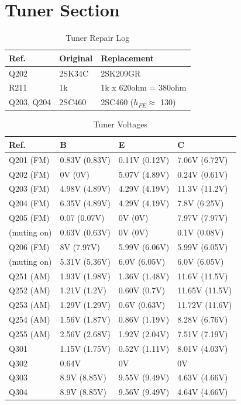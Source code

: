 \documentclass[]{article}
\begin{document}
\section{Tuner Section}

\begin{table}[H]
	\centering
	\caption{Tuner Repair Log}
	\label{tab:tuner_log}
	\begin{tabular}{|l|l|l|}
		\hline
		\textbf{Ref.} & \textbf{Original} & \textbf{Replacement} \\
		\hline
         Q202 & 2SK34C & 2SK209GR \\
        \hline
         R211 & 1k & 1k x 620ohm = 380ohm \\
        \hline
         Q203, Q204 & 2SC460 & 2SC460 ($h_{FE} \approx$ 130) \\
        \hline
	\end{tabular}
\end{table}

\begin{table}[H]
	\centering
	\caption{Tuner Voltages}
	\label{tab:tuner_voltages}
	\begin{tabular}{|l|l|l|l|}
    \hline
 \textbf{Ref.} & \textbf{B} & \textbf{E} & \textbf{C} \\
    \hline
    Q201 (FM) & 0.83V (0.83V) & 0.11V (0.12V) & 7.06V (6.72V)  \\
    \hline
    Q202 (FM) & 0V (0V) & 5.07V (4.89V) & 0.24V (0.61V)  \\
    \hline
    Q203 (FM) & 4.98V (4.89V) &  4.29V (4.19V) & 11.3V (11.2V) \\
    \hline
    Q204 (FM) & 6.35V (4.89V) & 4.29V (4.19V) & 7.8V (6.25V) \\ 
    \hline
    Q205 (FM) & 0.07 (0.07V) & 0V (0V) & 7.97V (7.97V)  \\
    (muting on)  & 0.63V (0.63V) & 0V (0V) & 0.1V (0.08V) \\ 
    \hline
    Q206 (FM) & 8V (7.97V)  & 5.99V (6.06V)  & 5.99V (6.05V)   \\
    (muting on) & 5.31V (5.36V) & 6.0V (6.05V)   & 6.0V (6.05V)  \\
    \hline
    Q251 (AM) & 1.93V (1.98V) &  1.36V (1.48V)  &  11.6V (11.5V) \\
    \hline
    Q252 (AM) & 1.21V (1.2V) & 0.60V (0.7V) &  11.65V (11.5V) \\
    \hline
    Q253 (AM) & 1.29V (1.29V) & 0.6V (0.63V) &  11.72V (11.6V) \\
    \hline
    Q254 (AM) & 1.56V (1.87V) & 0.86V (1.19V)  &  8.28V (6.76V) \\
    \hline
    Q255 (AM) & 2.56V (2.68V) &  1.92V (2.04V) & 7.51V (7.19V) \\
    \hline
    Q301 & 1.15V (1.75V) & 0.52V (1.11V)  & 8.01V (4.03V) \\
    \hline
    Q302 & 0.64V  & 0V   & 0V  \\
    \hline
    Q303 & 8.9V (8.85V) & 9.55V (9.49V) & 4.63V (4.66V) \\
    \hline
    Q304 & 8.9V (8.85V)  & 9.56V (9.49V) & 4.64V (4.66V) \\
    \hline
	\end{tabular}
\end{table}
\end{document}
